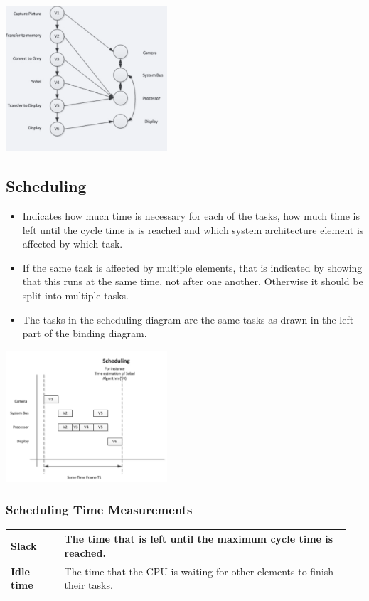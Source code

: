 		\includegraphics[width=0.45\textwidth]{./pictures/bindings.png}
		
	\subsection{Scheduling}
		\begin{itemize}
		  \item Indicates how much time is necessary for each of the tasks, how much time is left until the cycle time is is reached and which system architecture element is affected by which task.
		  \item If the same task is affected by multiple elements, that is indicated by showing that this runs at the same time, not after one another. Otherwise it should be split into multiple tasks.
		  \item The tasks in the scheduling diagram are the same tasks as drawn in the left part of the binding diagram.
		\end{itemize}
		
		\includegraphics[width=0.45\textwidth]{./pictures/scheduling.png}
		
		\subsubsection{Scheduling Time Measurements}
		\begin{table}[H]\centering
			\begin{tabular}{|p{0.15\linewidth}|p{0.8\linewidth}|}
				\hline
					\textbf{Slack}
						& The time that is left until the maximum cycle time is reached.\\
				\hline
					\textbf{Idle time}
						& The time that the CPU is waiting for other elements to finish their tasks.\\
				\hline
			\end{tabular}
		\end{table}
		
